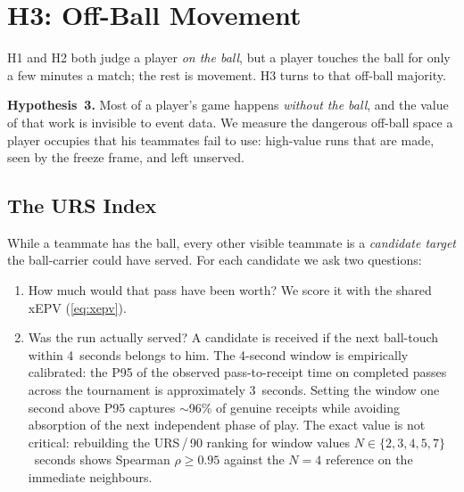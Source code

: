 \documentclass[12pt,a4paper]{article}
\begin{document}
\clearpage
\section{H3: Off-Ball Movement}\label{sec:h3}

H1 and H2 both judge a player \emph{on the ball}, but a player touches the ball for only a few minutes a match; the rest is movement. H3 turns to that off-ball majority.

\textbf{Hypothesis~3.}
Most of a player's game happens \emph{without the ball}, and the value of that work is invisible to event data.
We measure the dangerous off-ball space a player occupies that his teammates fail to use: high-value runs that are made, seen by the freeze frame, and left unserved.

\subsection{The URS Index}\label{sec:urs}

While a teammate has the ball, every other visible teammate is a \emph{candidate target} the ball-carrier could have served.
For each candidate we ask two questions:
\begin{enumerate}
    \item How much would that pass have been worth? We score it with the shared xEPV (\cref{eq:xepv}).
    \item Was the run actually served? A candidate is received if the next ball-touch within 4~seconds belongs to him. The 4-second window is empirically calibrated: the P95 of the observed pass-to-receipt time on completed passes across the tournament is approximately 3~seconds. Setting the window one second above P95 captures $\sim$96\% of genuine receipts while avoiding absorption of the next independent phase of play.  The exact value is not critical: rebuilding the URS\,/\,90 ranking for window values $N \in \{2, 3, 4, 5, 7\}$~seconds shows Spearman $\rho \geq 0.95$ against the $N=4$ reference on the immediate neighbours.
\end{enumerate}
\end{document}
